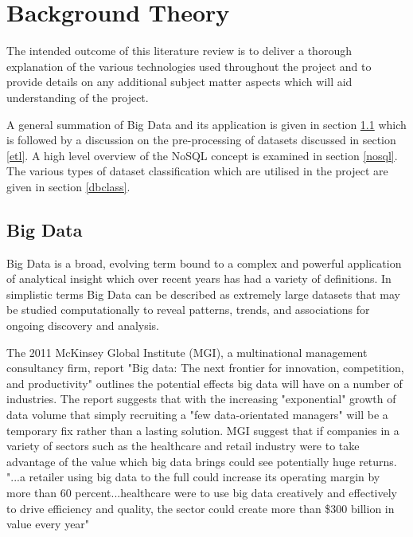 \chapter{Background Theory}
The intended outcome of this literature review is to deliver a thorough explanation of the various technologies used throughout the project and to provide details on any additional subject matter aspects which will aid understanding of the project. 

A general summation of Big Data and its application is given in section \ref{bigdata} which is followed by a discussion on the pre-processing of datasets discussed in section \ref{etl}. A high level overview of the NoSQL concept is examined in section \ref{nosql}. The various types of dataset classification which are utilised in the project are given in section \ref{dbclass}.

\section{Big Data}\label{bigdata}
Big Data is a broad, evolving term bound to a complex and powerful application of analytical insight which over recent years has had a variety of definitions. In simplistic terms Big Data can be described as extremely large datasets that may be studied computationally to reveal patterns, trends, and associations for ongoing discovery and analysis.

The 2011 McKinsey Global Institute (MGI), a multinational management consultancy firm, report "Big data: The next frontier for innovation, competition, and productivity" outlines the potential effects big data will have on a number of industries. The report suggests that with the increasing "exponential" growth of data volume that simply recruiting a "few data-orientated managers" will be a temporary fix rather than a lasting solution. MGI suggest that if companies in a variety of sectors such as the healthcare and retail industry were to take advantage of the value which big data brings could see potentially huge returns. "...a retailer using big data to the full could increase its operating margin by more than 60 percent...healthcare were to use big data creatively and effectively to drive efficiency and quality, the sector could create more than \$300 billion in value every year" \cite{mckinskey}

